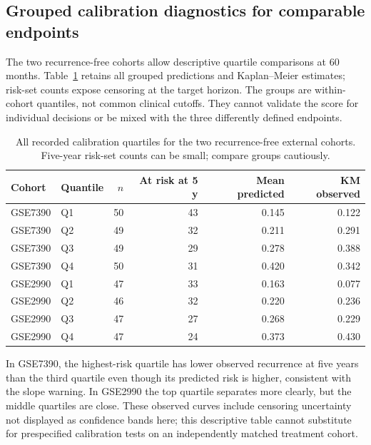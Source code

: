 \subsection{Grouped calibration diagnostics for comparable endpoints}
The two recurrence-free cohorts allow descriptive quartile comparisons at 60 months. Table~\ref{tab:calibration-quartiles} retains all grouped predictions and Kaplan--Meier estimates; risk-set counts expose censoring at the target horizon. The groups are within-cohort quantiles, not common clinical cutoffs. They cannot validate the score for individual decisions or be mixed with the three differently defined endpoints.
\begin{table}[htbp]\centering\small
\begin{tabular}{llrrrr}\hline
Cohort & Quantile & $n$ & At risk at 5 y & Mean predicted & KM observed \\ \hline
GSE7390 & Q1 & 50 & 43 & 0.145 & 0.122 \\
GSE7390 & Q2 & 49 & 32 & 0.211 & 0.291 \\
GSE7390 & Q3 & 49 & 29 & 0.278 & 0.388 \\
GSE7390 & Q4 & 50 & 31 & 0.420 & 0.342 \\
GSE2990 & Q1 & 47 & 33 & 0.163 & 0.077 \\
GSE2990 & Q2 & 46 & 32 & 0.220 & 0.236 \\
GSE2990 & Q3 & 47 & 27 & 0.268 & 0.229 \\
GSE2990 & Q4 & 47 & 24 & 0.373 & 0.430 \\
\hline\end{tabular}
\caption{All recorded calibration quartiles for the two recurrence-free external cohorts. Five-year risk-set counts can be small; compare groups cautiously.}\label{tab:calibration-quartiles}
\end{table}
In GSE7390, the highest-risk quartile has lower observed recurrence at five years than the third quartile even though its predicted risk is higher, consistent with the slope warning. In GSE2990 the top quartile separates more clearly, but the middle quartiles are close. These observed curves include censoring uncertainty not displayed as confidence bands here; this descriptive table cannot substitute for prespecified calibration tests on an independently matched treatment cohort.
